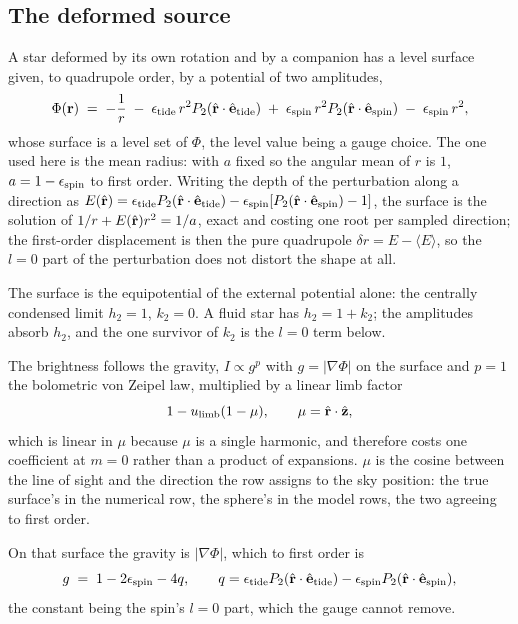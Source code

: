 \subsection{The deformed source}

A star deformed by its own rotation and by a companion has a level
surface given, to quadrupole order, by a potential of two amplitudes,
\begin{equation}
  \Phi({\mathbf r}) \;=\; -\frac{1}{r}
  \;-\;\epsilon_\text{tide}\,r^2P_2(\hat{\mathbf r}\cdot\hat{\mathbf e}_\text{tide})
  \;+\;\epsilon_\text{spin}\,r^2P_2(\hat{\mathbf r}\cdot\hat{\mathbf e}_\text{spin})
  \;-\;\epsilon_\text{spin}\,r^2 ,
  \label{eq:brief-potential}
\end{equation}
whose surface is a level set of $\Phi$, the level value being a gauge choice.  The one used
here is the mean radius: with $a$ fixed so the angular mean of $r$ is $1$, $a = 1 -
\epsilon_\text{spin}$ to first order.  Writing the depth of the perturbation along a direction as
$E(\hat{\mathbf r}) = \epsilon_\text{tide}{}P_2(\hat{\mathbf r}\cdot\hat{\mathbf e}_\text{tide})
- \epsilon_\text{spin}[P_2(\hat{\mathbf r}\cdot\hat{\mathbf e}_\text{spin})-1]$, the surface is the
solution of $1/r + E(\hat{\mathbf r})r^2 = 1/a$, exact and costing one root per sampled
direction; the first-order displacement is then the pure quadrupole
$\delta r = E - \langle E\rangle$, so the $l = 0$ part of the perturbation does not distort the
shape at all.

The surface is the equipotential of the external potential alone: the centrally condensed limit
$h_2 = 1$, $k_2 = 0$.  A fluid star has $h_2 = 1 + k_2$; the amplitudes absorb $h_2$, and the one
survivor of $k_2$ is the $l = 0$ term below.

The brightness follows the gravity, $I \propto g^p$ with $g = |\nabla\Phi|$ on the surface and
$p = 1$ the bolometric von Zeipel law, multiplied by a linear limb factor
\begin{equation}
  1 - u_\text{limb}(1-\mu) , \qquad \mu = \hat{\mathbf r}\cdot\hat{\mathbf z} ,
  \label{eq:brief-limb-law}
\end{equation}
which is linear in $\mu$ because $\mu$ is a single harmonic, and therefore costs one
coefficient at $m = 0$ rather than a product of expansions.  $\mu$ is the cosine between the
line of sight and the direction the row assigns to the sky position: the true surface's in the
numerical row, the sphere's in the model rows, the two agreeing to first order.

On that surface the gravity is $|\nabla\Phi|$, which to first order is
\begin{equation}
  g \;=\; 1 - 2\epsilon_\text{spin} - 4q , \qquad
  q = \epsilon_\text{tide}{}P_2(\hat{\mathbf r}\cdot\hat{\mathbf e}_\text{tide})
    - \epsilon_\text{spin}{}P_2(\hat{\mathbf r}\cdot\hat{\mathbf e}_\text{spin}) ,
  \label{eq:brief-gravity}
\end{equation}
the constant being the spin's $l = 0$ part, which the gauge cannot remove.

